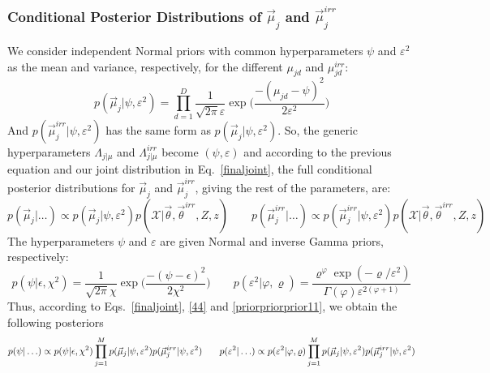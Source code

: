 \documentclass[journal,10pt]{elsart}
\begin{document}
\subsubsection{Conditional Posterior Distributions of $\vec{\mu}_{j}$ and $\vec{\mu}_{j}^{irr}$}
We consider independent Normal priors with common hyperparameters $\psi$ and $\varepsilon^2$ as the mean and variance, respectively, for the different $\mu_{jd}$ and $\mu_{jd}^{irr}$:
\begin{equation}\label{44}
p(\vec{\mu}_j|\psi, \varepsilon^2)=\prod_{d=1}^D\frac{1}{\sqrt{2\pi}\varepsilon}\exp\big(\frac{-(\mu_{jd}-\psi)^{2}}{2\varepsilon^{2}}\big)
\end{equation}
And $p(\vec{\mu}_j^{irr}|\psi, \varepsilon^2)$ has the same form as $p(\vec{\mu}_j|\psi, \varepsilon^2)$. So, the generic hyperparameters $\Lambda_{j|\mu}$ and $\Lambda_{j|\mu}^{irr}$ become $(\psi,\varepsilon)$ and according to the previous equation and our joint distribution in Eq.~\ref{finaljoint}, the full conditional posterior distributions for $\vec{\mu}_j$ and $\vec{\mu}_j^{irr}$, giving the rest of the parameters, are:
\begin{equation}\label{muposterior}
p(\vec{\mu}_j|\ldots) \propto p(\vec{\mu}_j|\psi,\varepsilon^2)p(\mathcal{X}|\vec{\theta},\vec{\theta}^{irr},Z,z) \qquad
p(\vec{\mu}_j^{irr}|\ldots) \propto p(\vec{\mu}_j^{irr}|\psi, \varepsilon^2)p(\mathcal{X}|\vec{\theta},\vec{\theta}^{irr},Z,z)
\end{equation}
The hyperparameters $\psi$ and $\varepsilon$ are given Normal and inverse Gamma priors, respectively:
\begin{equation}\label{priorpriorprior11}
p(\psi|\epsilon,\chi^2) = \frac{1}{\sqrt{2\pi}\chi}\exp\big({\frac{-(\psi-\epsilon)^{2}}{2\chi^2}}\big) \qquad p(\varepsilon^2|\varphi,\varrho) = \frac{\varrho^\varphi\exp(-\varrho/
\varepsilon^2)}{\Gamma(\varphi)\varepsilon^{2(\varphi+1)}}
\end{equation}
Thus, according to Eqs.~\ref{finaljoint}, \ref{44} and \ref{priorpriorprior11}, we obtain the following posteriors
\begin{equation}\label{posteriors11}
\small
p(\psi|\ldots) \propto p(\psi|\epsilon,\chi^2) \prod_{j=1}^M p(\vec{\mu}_j|\psi, \varepsilon^2)p(\vec{\mu}_j^{irr}|\psi, \varepsilon^2) \qquad p(\varepsilon^2|\ldots) \propto p(\varepsilon^2|\varphi,\varrho)\prod_{j=1}^M p(\vec{\mu}_j|\psi, \varepsilon^2)p(\vec{\mu}_j^{irr}|\psi, \varepsilon^2)
\end{equation}
\end{document}
